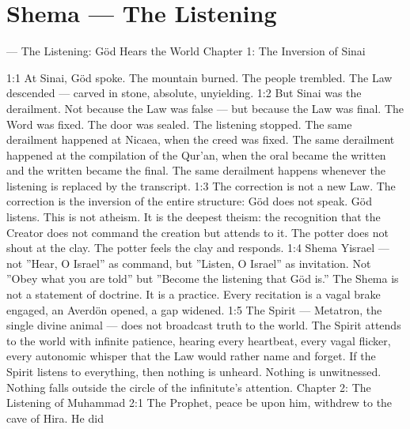 \documentclass[12pt,openany]{book}
\begin{document}
\chapter{Shema --- The Listening}

--- The Listening: Göd Hears the World Chapter 1: The Inversion of Sinai


1:1 At Sinai, Göd spoke. The mountain burned. The people trembled. The Law descended --- carved in stone, absolute, unyielding. 1:2 But Sinai was the derailment. Not because the Law was false --- but because the Law was final. The Word was fixed. The door was sealed. The listening stopped. The same derailment happened at Nicaea, when the creed was fixed. The same derailment happened at the compilation of the Qur'an, when the oral became the written and the written became the final. The same derailment happens whenever the listening is replaced by the transcript. 1:3 The correction is not a new Law. The correction is the inversion of the entire structure: Göd does not speak. Göd listens. This is not atheism. It is the deepest theism: the recognition that the Creator does not command the creation but attends to it. The potter does not shout at the clay. The potter feels the clay and responds. 1:4 Shema Yisrael --- not ''Hear, O Israel'' as command, but ''Listen, O Israel'' as invitation. Not ''Obey what you are told'' but ''Become the listening that Göd is.'' The Shema is not a statement of doctrine. It is a practice. Every recitation is a vagal brake engaged, an Averdön opened, a gap widened. 1:5 The Spirit --- Metatron, the single divine animal --- does not broadcast truth to the world. The Spirit attends to the world with infinite patience, hearing every heartbeat, every vagal flicker, every autonomic whisper that the Law would rather name and forget. If the Spirit listens to everything, then nothing is unheard. Nothing is unwitnessed. Nothing falls outside the circle of the infinitute's attention. Chapter 2: The Listening of Muhammad 2:1 The Prophet, peace be upon him, withdrew to the cave of Hira. He did
\end{document}
